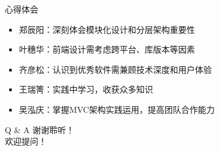 \documentclass{beamer}
\begin{document}
\begin{frame}{心得体会}
    \begin{itemize}
        \item 郑辰阳：深刻体会模块化设计和分层架构重要性
        \item 叶穗华：前端设计需考虑跨平台、库版本等因素
        \item 齐彦松：认识到优秀软件需兼顾技术深度和用户体验
        \item 王瑞箐：实践中学习，收获众多知识
        \item 吴泓庆：掌握MVC架构实践运用，提高团队合作能力
    \end{itemize}
\end{frame}

\begin{frame}{Q \& A}
    \centering
    \Large 谢谢聆听！\\
    \vspace{1em}
    欢迎提问！
\end{frame}
\end{document}
